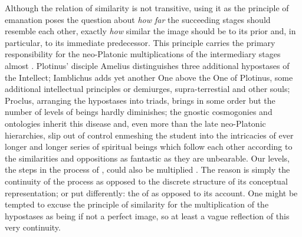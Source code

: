 Although the relation of similarity is not transitive, using it as the
principle of emanation poses the question about {\em how far} the succeeding
stages should resemble each other, exactly {\em how} similar the image should be
to its prior and, in particular, to its immediate predecessor. This principle
carries the primary responsibility for the 
neo-Platonic multiplications of the intermediary stages almost . Plotinus' disciple Amelius distinguishes three additional
hypostases of the Intellect; Iamblichus adds yet another One above the One of
Plotinus, some additional intellectual principles or demiurges, supra-terrestial
and other souls; Proclus, arranging the hypostases into triads, brings in some
order but the number of levels of beings hardly diminishes;
the gnostic cosmogonies and ontologies inherit this disease and, even more than
the late neo-Platonic hierarchies, slip out of control enmeshing the student
into the intricacies of ever longer and longer series of spiritual beings which
follow each other according to the similarities and oppositions as fantastic as
they are unbearable. Our
levels, the steps in the process of , could also be multiplied
. The reason is simply the continuity of the process as opposed
to the discrete structure of its conceptual representation; or put differently:
the  of  as opposed to its 
account.
One might be tempted to excuse the principle of similarity for the
multiplication of the hypostases as being if not a perfect image, so at least a
vague reflection of this very continuity.

